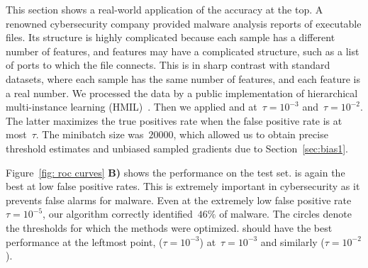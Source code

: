 This section shows a real-world application of the accuracy at the top. A renowned cybersecurity company provided malware analysis reports of executable files. Its structure is highly complicated because each sample has a different number of features, and features may have a complicated structure, such as a list of ports to which the file connects. This is in sharp contrast with standard datasets, where each sample has the same number of features, and each feature is a real number. We processed the data by a public implementation of hierarchical multi-instance learning (HMIL)~\cite{pevny2017using}. Then we applied \DeepTopPush and \PatMatNP at~$\tau=10^{-3}$ and~$\tau=10^{-2}$. The latter maximizes the true positives rate when the false positive rate is at most~$\tau$. The minibatch size was~$20000$, which allowed us to obtain precise threshold estimates and unbiased sampled gradients due to Section~\ref{sec:bias1}.

Figure~\ref{fig: roc curves} \textbf{B)} shows the performance on the test set. \DeepTopPush is again the best at low false positive rates. This is extremely important in cybersecurity as it prevents false alarms for malware. Even at the extremely low false positive rate~$\tau=10^{-5}$, our algorithm correctly identified~$46\%$ of malware. The circles denote the thresholds for which the methods were optimized. \DeepTopPush should have the best performance at the leftmost point, \PatMatNP ($\tau=10^{-3}$) at~$\tau=10^{-3}$ and similarly \PatMatNP($\tau=10^{-2}$).
